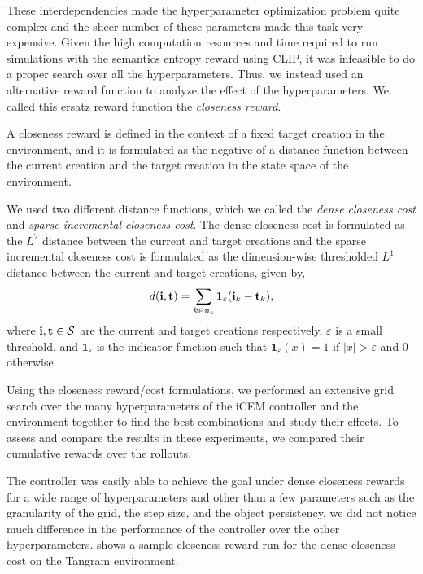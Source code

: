 These interdependencies made the hyperparameter optimization problem quite complex and the sheer number of these parameters made this task very expensive.
Given the high computation resources and time required to run simulations with the semantics entropy reward using CLIP, it was infeasible to do a proper search over all the hyperparameters.
Thus, we instead used an alternative reward function to analyze the effect of the hyperparameters.
We called this ersatz reward function the \emph{closeness reward}.

A closeness reward is defined in the context of a fixed target creation in the environment, and it is formulated as the negative of a distance function between the current creation and the target creation in the state space of the environment.

We used two different distance functions, which we called the \emph{dense closeness cost} and \emph{sparse incremental closeness cost}.
The dense closeness cost is formulated as the \(L^2\) distance between the current and target creations and the sparse incremental closeness cost is formulated as the dimension-wise thresholded \(L^1\) distance between the current and target creations, given by,
\begin{equation}
    \label{eq:closeness-reward-sparse}
    d(\mathbf{i}, \mathbf{t}) = \sum_{k \in n_s} \bm{1}_\varepsilon(\mathbf{i}_k - \mathbf{t}_k),
\end{equation}
where \(\mathbf{i}, \mathbf{t} \in \mathcal{S}\) are the current and target creations respectively, \(\varepsilon\) is a small threshold, and \(\bm{1}_\varepsilon\) is the indicator function such that \(\bm{1}_\varepsilon(x) = 1\) if \(|x| > \varepsilon\) and \(0\) otherwise.

Using the closeness reward/cost formulations, we performed an extensive grid search over the many hyperparameters of the iCEM controller and the environment together to find the best combinations and study their effects.
To assess and compare the results in these experiments, we compared their cumulative rewards over the rollouts.

The controller was easily able to achieve the goal under dense closeness rewards for a wide range of hyperparameters and other than a few parameters such as the granularity of the grid, the step size, and the object persistency, we did not notice much difference in the performance of the controller over the other hyperparameters.
 shows a sample closeness reward run for the dense closeness cost on the Tangram environment.

